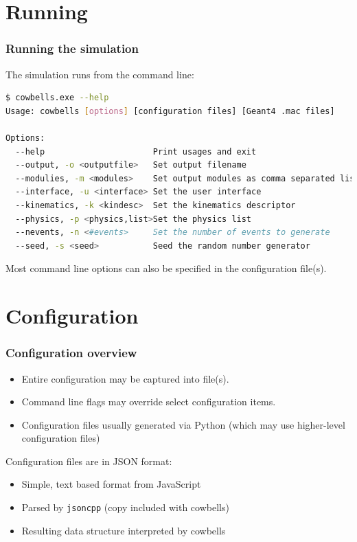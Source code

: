 \documentclass[xcolor=dvipsnames]{beamer}
\begin{document}
\section{Running}

\begin{frame}[fragile]
  \frametitle{Running the simulation}

The simulation runs from the command line:

\begin{lstlisting}[language=sh]
$ cowbells.exe --help
Usage: cowbells [options] [configuration files] [Geant4 .mac files]

Options:
  --help                      Print usages and exit
  --output, -o <outputfile>   Set output filename
  --modulies, -m <modules>    Set output modules as comma separated list
  --interface, -u <interface> Set the user interface
  --kinematics, -k <kindesc>  Set the kinematics descriptor
  --physics, -p <physics,list>Set the physics list
  --nevents, -n <#events>     Set the number of events to generate
  --seed, -s <seed>           Seed the random number generator
\end{lstlisting}

Most command line options can also be specified in the configuration file(s).
\end{frame}

\section{Configuration}

\begin{frame}
  \frametitle{Configuration overview}
  \begin{itemize}
  \item Entire configuration may be captured into file(s).
  \item Command line flags may override select configuration items.
  \item Configuration files usually generated via Python (which may use higher-level configuration files)
  \end{itemize}

  Configuration files are in JSON format:
  \begin{itemize}
  \item Simple, text based format from JavaScript
  \item Parsed by \texttt{jsoncpp} (copy included with cowbells)
  \item Resulting data structure interpreted by cowbells
  \end{itemize}

\end{frame}
\end{document}
